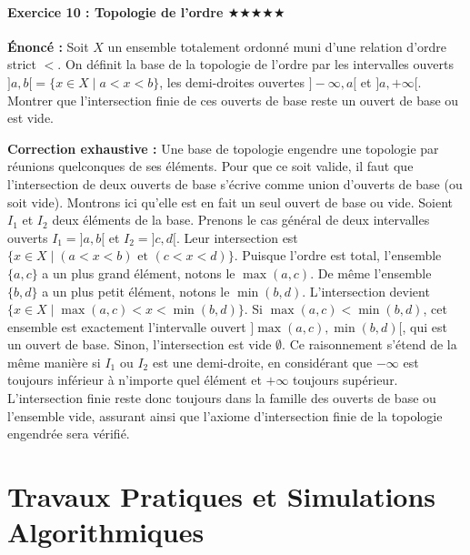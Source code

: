 \documentclass[11pt,a4paper]{article}
\begin{document}
\subsection*{Exercice 10 : Topologie de l'ordre \quad $\bigstar\bigstar\bigstar\bigstar\bigstar$}
\textbf{Énoncé :}
Soit $X$ un ensemble totalement ordonné muni d'une relation d'ordre strict $<$. On définit la base de la topologie de l'ordre par les intervalles ouverts $]a, b[ = \{x \in X \mid a < x < b\}$, les demi-droites ouvertes $]-\infty, a[$ et $]a, +\infty[$. Montrer que l'intersection finie de ces ouverts de base reste un ouvert de base ou est vide.

\textbf{Correction exhaustive :}
Une base de topologie engendre une topologie par réunions quelconques de ses éléments. Pour que ce soit valide, il faut que l'intersection de deux ouverts de base s'écrive comme union d'ouverts de base (ou soit vide). Montrons ici qu'elle est en fait un seul ouvert de base ou vide.
Soient $I_1$ et $I_2$ deux éléments de la base.
Prenons le cas général de deux intervalles ouverts $I_1 = ]a, b[$ et $I_2 = ]c, d[$.
Leur intersection est $\{x \in X \mid (a < x < b) \text{ et } (c < x < d)\}$.
Puisque l'ordre est total, l'ensemble $\{a, c\}$ a un plus grand élément, notons le $\max(a,c)$. De même l'ensemble $\{b, d\}$ a un plus petit élément, notons le $\min(b,d)$.
L'intersection devient $\{x \in X \mid \max(a,c) < x < \min(b,d)\}$.
Si $\max(a,c) < \min(b,d)$, cet ensemble est exactement l'intervalle ouvert $]\max(a,c), \min(b,d)[$, qui est un ouvert de base.
Sinon, l'intersection est vide $\emptyset$.
Ce raisonnement s'étend de la même manière si $I_1$ ou $I_2$ est une demi-droite, en considérant que $-\infty$ est toujours inférieur à n'importe quel élément et $+\infty$ toujours supérieur. L'intersection finie reste donc toujours dans la famille des ouverts de base ou l'ensemble vide, assurant ainsi que l'axiome d'intersection finie de la topologie engendrée sera vérifié.

\newpage
\part{Travaux Pratiques et Simulations Algorithmiques}
\end{document}
